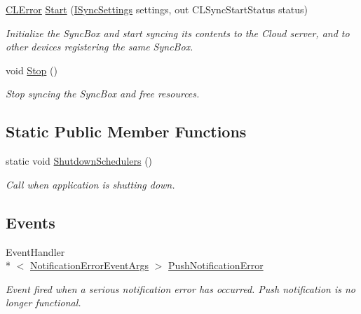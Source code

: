 \begin{DoxyCompactItemize}
\hyperlink{class_cloud_api_public_1_1_model_1_1_c_l_error}{C\-L\-Error} \hyperlink{class_cloud_api_public_1_1_c_l_sync_a1b700631eb605ad6e065dc4296fcb912}{Start} (\hyperlink{interface_cloud_api_public_1_1_interfaces_1_1_i_sync_settings}{I\-Sync\-Settings} settings, out C\-L\-Sync\-Start\-Status status)
\begin{DoxyCompactList}\small\item\em Initialize the Sync\-Box and start syncing its contents to the Cloud server, and to other devices registering the same Sync\-Box. \end{DoxyCompactList}\item 
void \hyperlink{class_cloud_api_public_1_1_c_l_sync_aa76639968094d5dec2ec19e10163612f}{Stop} ()
\begin{DoxyCompactList}\small\item\em Stop syncing the Sync\-Box and free resources. \end{DoxyCompactList}\end{DoxyCompactItemize}
\subsection*{Static Public Member Functions}
\begin{DoxyCompactItemize}
\item 
static void \hyperlink{class_cloud_api_public_1_1_c_l_sync_a150338311c93398031613a014205d319}{Shutdown\-Schedulers} ()
\begin{DoxyCompactList}\small\item\em Call when application is shutting down. \end{DoxyCompactList}\end{DoxyCompactItemize}
\subsection*{Events}
\begin{DoxyCompactItemize}
\item 
Event\-Handler\\*
$<$ \hyperlink{class_cloud_api_public_1_1_push_notification_1_1_notification_error_event_args}{Notification\-Error\-Event\-Args} $>$ \hyperlink{class_cloud_api_public_1_1_c_l_sync_a986a038f0f504de78c6ea811dacb0b21}{Push\-Notification\-Error}
\begin{DoxyCompactList}\small\item\em Event fired when a serious notification error has occurred. Push notification is no longer functional. \end{DoxyCompactList}\end{DoxyCompactItemize}


